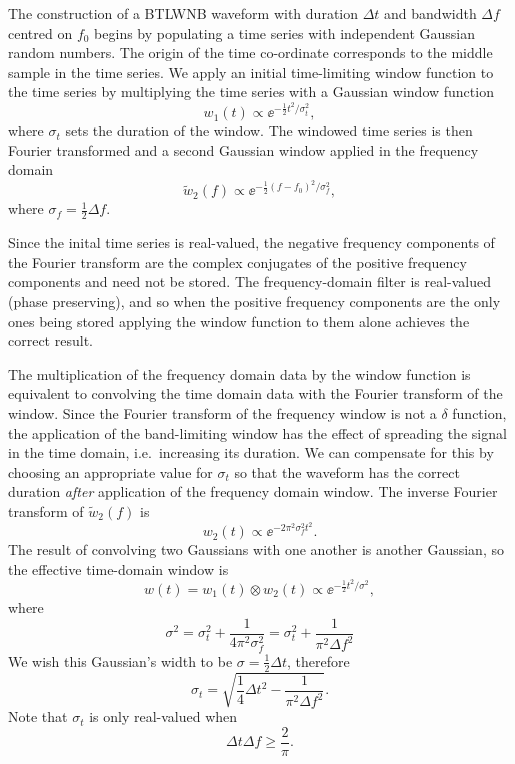 \documentclass[10pt]{article}
\begin{document}
The construction of a BTLWNB waveform with duration \(\Delta t\) and
bandwidth \(\Delta f\) centred on \(f_{0}\) begins by populating a time
series with independent Gaussian random numbers.  The origin of the time
co-ordinate corresponds to the middle sample in the time series.  We apply
an initial time-limiting window function to the time series by multiplying
the time series with a Gaussian window function
\begin{equation}
w_{1}(t)
   \propto \ee^{-\frac{1}{2} t^{2} / \sigma_{t}^{2}},
\end{equation}
where \(\sigma_{t}\) sets the duration of the window.  The windowed time
series is then Fourier transformed and a second Gaussian window applied in
the frequency domain
\begin{equation}
\tilde{w}_{2}(f)
   \propto \ee^{-\frac{1}{2} (f - f_{0})^{2} / \sigma_{f}^{2}},
\end{equation}
where \(\sigma_{f} = \frac{1}{2} \Delta f\).

Since the inital time series is real-valued, the negative frequency
components of the Fourier transform are the complex conjugates of the
positive frequency components and need not be stored.  The frequency-domain
filter is real-valued (phase preserving), and so when the positive
frequency components are the only ones being stored applying the window
function to them alone achieves the correct result.

The multiplication of the frequency domain data by the window function is
equivalent to convolving the time domain data with the Fourier transform of
the window.  Since the Fourier transform of the frequency window is not a
\(\delta\) function, the application of the band-limiting window has the
effect of spreading the signal in the time domain, i.e.\ increasing its
duration.  We can compensate for this by choosing an appropriate value for
\(\sigma_{t}\) so that the waveform has the correct duration \emph{after}
application of the frequency domain window.  The inverse Fourier transform
of \(\tilde{w}_{2}(f)\) is
\begin{equation}
w_{2}(t)
   \propto \ee^{-2 \pi^{2} \sigma_{f}^{2} t^{2}}.
\end{equation}
The result of convolving two Gaussians with one another is another
Gaussian, so the effective time-domain window is
\begin{equation}
w(t)
   = w_{1}(t) \otimes w_{2}(t)
   \propto \ee^{-\frac{1}{2} t^{2} / \sigma^{2}},
\end{equation}
where
\begin{equation}
\sigma^{2}
   = \sigma_{t}^{2} + \frac{1}{4 \pi^{2} \sigma_{f}^{2}}
   = \sigma_{t}^{2} + \frac{1}{\pi^{2} \Delta f^{2}}
\end{equation}
We wish this Gaussian's width to be \(\sigma = \frac{1}{2} \Delta t\),
therefore
\begin{equation}
\sigma_{t}
   = \sqrt{\frac{1}{4} \Delta t^{2} - \frac{1}{\pi^{2} \Delta f^{2}}}.
\end{equation}
Note that \(\sigma_{t}\) is only real-valued when
\begin{equation}
\Delta t \Delta f
   \geq \frac{2}{\pi}.
\end{equation}
\end{document}
